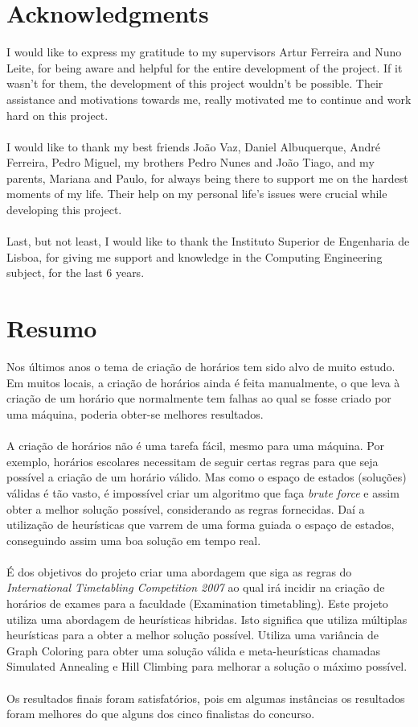 \chapter*{Acknowledgments}

I would like to express my gratitude to my supervisors Artur Ferreira and Nuno Leite, for being aware and helpful for the entire development of the project. If it wasn't for them, the development of this project wouldn't be possible. Their assistance and motivations towards me, really motivated me to continue and work hard on this project.\\
\\
I would like to thank my best friends João Vaz, Daniel Albuquerque, André Ferreira, Pedro Miguel, my brothers Pedro Nunes and João Tiago, and my parents, Mariana and Paulo, for always being there to support me on the hardest moments of my life. Their help on my personal life's issues were crucial while developing this project.\\
\\
Last, but not least, I would like to thank the Instituto Superior de Engenharia de Lisboa, for giving me support and knowledge in the Computing Engineering subject, for the last 6 years.
\
\chapter*{Resumo}

Nos últimos anos o tema de criação de horários tem sido alvo de muito estudo. Em muitos locais, a criação de horários ainda é feita manualmente, o que leva à criação de um horário que normalmente tem falhas ao qual se fosse criado por uma máquina, poderia obter-se melhores resultados.\\
\\
A criação de horários não é uma tarefa fácil, mesmo para uma máquina. Por exemplo, horários escolares necessitam de seguir certas regras para que seja possível a criação de um horário válido. Mas como o espaço de estados (soluções) válidas é tão vasto, é impossível criar um algoritmo que faça \textit{brute force} e assim obter a melhor solução possível, considerando as regras fornecidas. Daí a utilização de heurísticas que varrem de uma forma guiada o espaço de estados, conseguindo assim uma boa solução em tempo real.\\
\\
É dos objetivos do projeto criar uma abordagem que siga as regras do \textit{International Timetabling Competition 2007} ao qual irá incidir na criação de horários de exames para a faculdade (Examination timetabling). Este projeto utiliza uma abordagem de heurísticas hibridas. Isto significa que utiliza múltiplas heurísticas para a obter a melhor solução possível. Utiliza uma variância de Graph Coloring para obter uma solução válida e meta-heurísticas chamadas Simulated Annealing e Hill Climbing para melhorar a solução o máximo possível.\\
\\
Os resultados finais foram satisfatórios, pois em algumas instâncias os resultados foram melhores do que alguns dos cinco finalistas do concurso.
\
